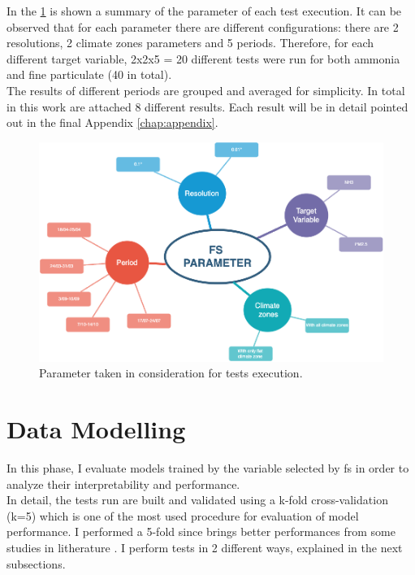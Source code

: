 In the \ref{fig:test_params} is shown a summary of the parameter of each test execution.
It can be observed that for each parameter there are different configurations: there are 2 resolutions, 2 climate zones parameters and 5 periods. Therefore, for each different target variable, 2x2x5 = 20 different tests were run for both ammonia and fine particulate (40 in total). \\
The results of different periods are grouped and averaged for simplicity. In total in this work are attached 8 different results. Each result will be in detail pointed out in the final Appendix \ref{chap:appendix}.
\begin{figure}[H]
    \centering
    \includegraphics[width=.9\textwidth]{images/test_param.png}
    \caption{Parameter taken in consideration for tests execution.}
    \label{fig:test_params}
\end{figure}
\bigbreak
\section{Data Modelling}
\label{sec:modelling}
In this phase, I evaluate models trained by the variable selected by \acrshort{fs} in order to analyze their interpretability and performance.\\
In detail, the tests run are built and validated using a k-fold cross-validation (k=5) which is one of the most used procedure for evaluation of model performance.
I performed a 5-fold since brings better performances from some studies in litherature  \cite{anguita2005k} \cite{jung2020evaluation}.
I perform tests in 2 different ways, explained in the next subsections.
